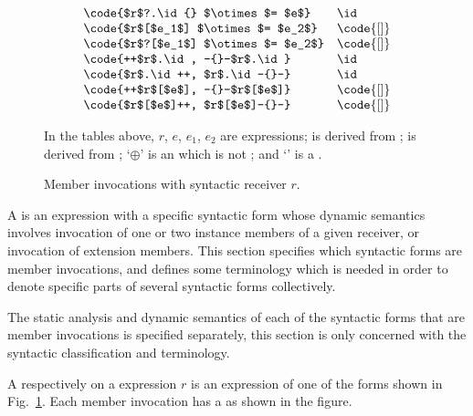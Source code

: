\documentclass[makeidx]{article}
\begin{document}
{\begin{figure}[h]
\begin{minipage}[t]{\textwidth}
\begin{displaymath}
\begin{array}[t]{ll}
        \code{$r$?.\id{} $\otimes$= $e$}     & \id \\
        \code{$r$[$e_1$] $\otimes$= $e_2$}  & \code{[]} \\
        \code{$r$?[$e_1$] $\otimes$= $e_2$} & \code{[]} \\
        \code{++$r$.\id, -{}-$r$.\id}       & \id \\
        \code{$r$.\id++, $r$.\id-{}-}       & \id \\
        \code{++$r$[$e$], -{}-$r$[$e$]}     & \code{[]} \\
        \code{$r$[$e$]++, $r$[$e$]-{}-}     & \code{[]}
      \end{array}
    \end{displaymath}
  \end{minipage}

  \vspace{4mm}
  \begin{minipage}[t]{\textwidth}
    \small
    In the tables above,
    $r$, $e$, $e_1$, $e_2$ are expressions;
     is derived from ;
     is derived from ;
    `$\oplus$' is an  which is not \lit{==};
    and `\code{$\otimes$=}' is a .
  \end{minipage}
  \caption{Member invocations with syntactic receiver $r$.}
  \label{fig:memberInvocations}
\end{figure}

\LMHash{}%
A  is an expression with a specific syntactic form
whose dynamic semantics involves invocation of
one or two instance members of a given receiver,
or invocation of extension members.
This section specifies which syntactic forms are member invocations,
and defines some terminology
which is needed in order to denote
specific parts of several syntactic forms collectively.

\LMHash{}%
The static analysis and dynamic semantics of
each of the syntactic forms that are member invocations
is specified separately,
this section is only concerned with
the syntactic classification and terminology.


\LMHash{}%
A
respectively
on a
expression $r$ is an expression of
one of the forms shown in Fig.~\ref{fig:memberInvocations}.
Each member invocation has a
as shown in the figure.

}
\end{document}
